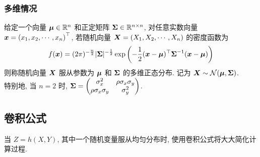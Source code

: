 \subsubsection{多维情况}

\begin{definition}[多维正态分布]
    给定一个向量 $\vb*{\mu}\in \mathbb{R}^n$ 和正定矩阵 $\vb*{\Sigma}\in \mathbb{R}^{n\times n}$, 对任意实数向量 $\vb*{x}=\qty(x_1, x_2, \cdots , x_n)^\top$, 若随机向量 $\vb*{X}=\qty(X_1, X_2, \cdots ,X_n)$ 的密度函数为 $$
    f(\vb*{x})=(2\pi)^{-\frac{n}{2}}|\vb*{\Sigma}|^{-\frac{1}{2}}\exp\qty(-\dfrac{1}{2}(\vb*{x}-\vb*{\mu})^\top\vb*{\Sigma}^{-1}(\vb*{x}-\vb*{\mu}))
    $$
    则称随机向量 $\vb*{X}$ 服从参数为 $\vb*{\mu}$ 和 $\vb*{\Sigma}$ 的多维正态分布. 记为 $\vb*{X}\sim \mathcal{N} (\vb*{\mu},\vb*{\Sigma})$.\\ 
    特别地, 当 $n=2$ 时, $\vb*{\Sigma}=\begin{pmatrix} \sigma_x^2 & \rho\sigma_x\sigma_y \\ \rho\sigma_x\sigma_y & \sigma_y^2 \\\end{pmatrix}$.
\end{definition}

\subsection{卷积公式}

当 $Z=h(X,Y)$, 其中一个随机变量服从均匀分布时, 使用卷积公式将大大简化计算过程.

